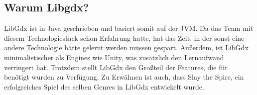 
\subsection{Warum Libgdx?}\label{subsec:warum-libgdx}

\renewcommand{\kapitelautor}{Autor: Marvin Kurka}

LibGdx ist in Java geschrieben und basiert somit auf der JVM.
Da das Team mit diesem Technologiestack schon Erfahrung hatte, hat das Zeit, in der sonst eine andere Technologie
hätte gelernt werden müssen gespart.
Außerdem, ist LibGdx minimalistischer als Engines wie Unity, was zusätzlich den Lernaufwand verringert hat.
Trotzdem stellt LibGdx den Großteil der Features, die für \FF benötigt wurden zu Verfügung.
Zu Erwähnen ist auch, dass Slay the Spire, ein erfolgreiches Spiel des selben Genres in LibGdx entwickelt wurde.

\renewcommand{\kapitelautor}{}
